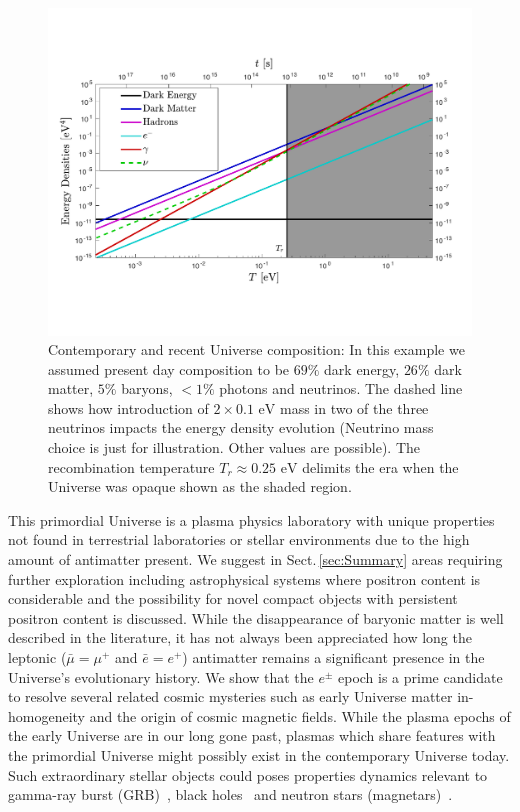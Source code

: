 \documentclass[universe,article,submit,moreauthors,pdftex,a4paper]{Definitions/mdpi}
\newcommand{\eV}{\text{ eV}}
\newcommand*{\rsec}[1]{Sect.\,{\ref{#1}}}
\begin{document}
\begin{figure}[ht]
 \centerline{\includegraphics[trim=20 90 30 90,clip,width=\textwidth]{./plots/energy_densities_new.pdf}}
 \caption{Contemporary and recent Universe composition: In this example we assumed present day composition to be $69\%$ dark energy, $26\%$ dark matter, $5\%$ baryons, $<1\%$ photons and neutrinos. The dashed line shows how introduction of $2\times 0.1\eV$ mass in two of the three neutrinos impacts the energy density evolution (Neutrino mass choice is just for illustration. Other values are possible). The recombination temperature $T_{r}\approx0.25\eV$ delimits the era when the Universe was opaque shown as the shaded region. \label{CosmicDensity}}
\end{figure}

This primordial Universe is a plasma physics laboratory with unique properties not found in terrestrial laboratories or stellar environments due to the high amount of antimatter present. We suggest in \rsec{sec:Summary} areas requiring further exploration including astrophysical systems where positron content is considerable and the possibility for novel compact objects with persistent positron content is discussed. While the disappearance of baryonic matter is well described in the literature, it has not always been appreciated how long the leptonic ($\bar{\mu}=\mu^{+}$ and $\bar{e}=e^{+}$) antimatter remains a significant presence in the Universe's evolutionary history. We show that the $e^{\pm}$ epoch is a prime candidate to resolve several related cosmic mysteries such as early Universe matter in-homogeneity and the origin of cosmic magnetic fields. While the plasma epochs of the early Universe are in our long gone past, plasmas which share features with the primordial Universe might possibly exist in the contemporary Universe today. Such extraordinary stellar objects could poses properties dynamics relevant to gamma-ray burst (GRB)~\cite{Ruffini:2001fe,Aksenov:2008ze,Aksenov:2010vi,Ruffini:2012it}, black holes~\cite{Ruffini:2003yt,Ruffini:2009hg,Ruffini:2000yu} and neutron stars (magnetars)~\cite{Han:2011er,Belvedere:2012uc}.
\end{document}
